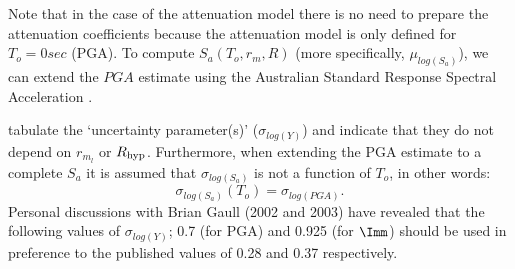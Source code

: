 Note that in the case of the \citet{eqrm_Gaull90a} attenuation model
there is no need to prepare the attenuation coefficients because the
attenuation model is only defined for $T_o=0 sec$ (PGA). To compute
$S_a(T_o,r_m,R)$ (more specifically, $\mu_{log(S_a)}$), we can
extend the $PGA$ estimate using the Australian Standard Response
Spectral Acceleration \citep{eqrm_Aus93}.

\citet[Table 4]{eqrm_Gaull90a} tabulate the `uncertainty
parameter(s)' ($\sigma_{log(Y)}$) and indicate that they do not
depend on $r_{m_l}$ or $\Rhyp$. Furthermore, when extending the PGA
estimate to a complete $S_a$ it is assumed that $\sigma_{log(S_a)}$
is not a function of $T_o$, in other words:
\begin{equation}
\sigma_{log(S_a)}(T_o) = \sigma_{log(PGA)}.
\end{equation}
Personal discussions with Brian Gaull (2002 and 2003) have revealed
that the following values of $\sigma_{log(Y)}$; 0.7 (for PGA) and
0.925 (for $\Imm$) should be used in preference to the published
values of 0.28 and 0.37 respectively.
